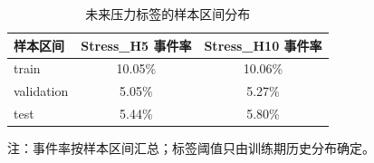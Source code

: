 \begin{table}[tbp]
\centering
\caption{未来压力标签的样本区间分布}
\label{tab:label-distribution}
\small
\begin{threeparttable}
\begin{tabular}{lcc}
\toprule
样本区间 & Stress\_H5 事件率 & Stress\_H10 事件率 \\
\midrule
train & 10.05\% & 10.06\% \\
validation & 5.05\% & 5.27\% \\
test & 5.44\% & 5.80\% \\
\bottomrule
\end{tabular}
\begin{tablenotes}[flushleft]
\footnotesize
\item 注：事件率按样本区间汇总；标签阈值只由训练期历史分布确定。
\end{tablenotes}
\end{threeparttable}
\end{table}
